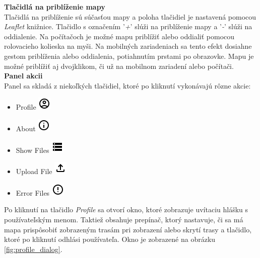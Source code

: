 \noindent\textbf{Tlačidlá na priblíženie mapy}\\
\indent Tlačidlá na priblíženie sú súčasťou mapy a poloha tlačidiel je nastavená pomocou \textit{Leaflet} knižnice\cite{leaflet}. Tlačidlo s označením '\textit{+}' slúži na priblíženie mapy a '\textit{-}' slúži na oddialenie. Na počítačoch je možné mapu priblížiť alebo oddialiť pomocou rolovacieho kolieska na myši. Na mobilných zariadeniach sa tento efekt dosiahne gestom priblíženia alebo oddialenia, potiahnutím prstami po obrazovke. Mapu je možné priblížiť aj dvojklikom, či už na mobilnom zariadení alebo počítači.\\

\noindent\textbf{Panel akcii}\\
\indent Panel sa skladá z niekoľkých tlačidiel, ktoré po kliknutí vykonávajú rôzne akcie:
\begin{itemize}
  \item Profile \includegraphics{img/icons/profile.png} \footnotemark{}
  \item About \includegraphics{img/icons/info.png} \footnotemark[\value{footnote}]
  \item Show Files \includegraphics{img/icons/files.png} \footnotemark[\value{footnote}]
  \item Upload File \includegraphics{img/icons/upload.png} \footnotemark[\value{footnote}]
  \item Error Files \includegraphics{img/icons/error.png} \footnotemark[\value{footnote}]
\end{itemize}


Po kliknutí na tlačidlo \textit{Profile} sa otvorí  okno, ktoré zobrazuje uvítaciu hlášku s používateľským menom. Taktiež obsahuje prepínač, ktorý nastavuje, či sa má mapa prispôsobiť zobrazeným trasám pri zobrazení alebo skrytí trasy a tlačidlo, ktoré po kliknutí odhlási používateľa. Okno je zobrazené na obrázku \ref{fig:profile_dialog}.

